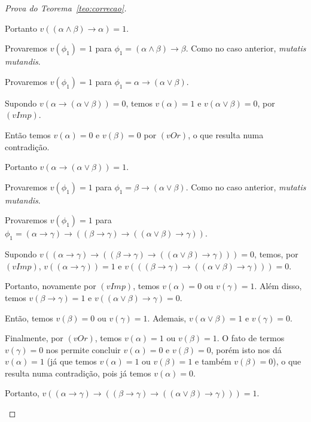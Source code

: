 \begin{proof}[Prova do Teorema~\ref{teo:correcao}]
\begin{provaporcasos}
\begin{provaporsubcasos}
                    Portanto $v((\alpha \land \beta) \to \alpha) = 1$.

                \subcasodeprova Provaremos $v(\phi_{1}) = 1$ para $\phi_{1} = (\alpha \land \beta) \to \beta$. Como no caso anterior, \textit{mutatis mutandis}.

                \subcasodeprova Provaremos $v(\phi_{1}) = 1$ para $\phi_{1} = \alpha \to (\alpha \lor \beta)$. 
                
                    Supondo $v(\alpha \to (\alpha \lor \beta)) = 0$, temos $v(\alpha) = 1$ e $v(\alpha \lor \beta) = 0$, por $(vImp)$. 
                    
                    Então temos $v(\alpha) = 0$ e $v(\beta) = 0$ por $(vOr)$, o que resulta numa contradição. 
                    
                    Portanto $v(\alpha \to (\alpha \lor \beta)) = 1$.

                \subcasodeprova Provaremos $v(\phi_{1}) = 1$ para $\phi_{1} = \beta \to (\alpha \lor \beta)$. Como no caso anterior, \textit{mutatis mutandis}.

                \subcasodeprova Provaremos $v(\phi_{1}) = 1$ para $\phi_{1} = (\alpha \to \gamma) \to ((\beta \to \gamma) \to ((\alpha \lor \beta) \to \gamma))$. 
                
                    Supondo $v((\alpha \to \gamma) \to ((\beta \to \gamma) \to ((\alpha \lor \beta) \to \gamma))) = 0$, temos, por $(vImp)$, $v((\alpha \to \gamma)) = 1$ e $v(((\beta \to \gamma) \to ((\alpha \lor \beta) \to \gamma))) = 0$. 
                    
                    Portanto, novamente por $(vImp)$, temos $v(\alpha) = 0$ ou $v(\gamma) = 1$. Além disso, temos $v(\beta \to \gamma) = 1$ e $v((\alpha \lor \beta) \to \gamma) = 0$. 
                    
                    Então, temos $v(\beta) = 0$ ou $v(\gamma) = 1$. Ademais, $v(\alpha \lor \beta) = 1$ e $v(\gamma) = 0$. 
                    
                    Finalmente, por $(vOr)$, temos $v(\alpha) = 1$ ou $v(\beta) = 1$. O fato de termos $v(\gamma) = 0$ nos permite concluir $v(\alpha) = 0$ e $v(\beta) = 0$, porém isto nos dá $v(\alpha) = 1$ (já que temos $v(\alpha) = 1$ ou $v(\beta) = 1$ e também $v(\beta) = 0$), o que resulta numa contradição, pois já temos $v(\alpha) = 0$. 
                    
                    Portanto, $v((\alpha \to \gamma) \to ((\beta \to \gamma) \to ((\alpha \lor \beta) \to \gamma))) = 1$.


\end{provaporsubcasos}
\end{provaporcasos}
\end{proof}
